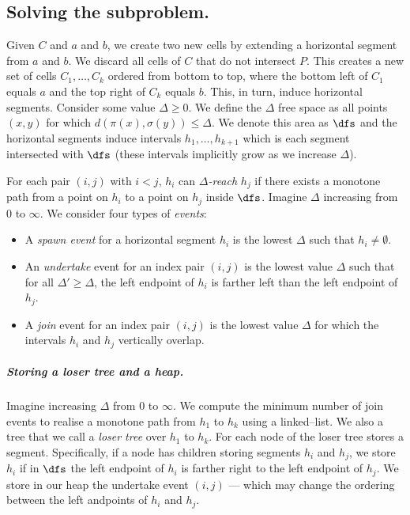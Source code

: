 \subsection{Solving the subproblem.}
Given $C$ and $a$ and $b$, we create two new cells by extending a horizontal segment from $a$ and $b$. We discard all cells of $C$ that do not intersect $P$. 
This creates a new set of cells $C_1, \ldots, C_k$ ordered from bottom to top, where the bottom left of $C_1$ equals $a$ and the top right of $C_k$ equals $b$. 
This, in turn,  induce horizontal segments. 
Consider some value $\Delta \geq 0$.
We define the $\Delta$ free space as all points $(x, y)$ for which $d(\pi(x), \sigma(y)) \leq \Delta$. We denote this area as $\dfs$ and the horizontal segments induce intervals  $h_1, \ldots, h_{k+1}$ which is each segment intersected with $\dfs$ (these intervals implicitly grow as we increase $\Delta$). 

For each pair $(i, j)$ with $i < j$, $h_i$ can \emph{$\Delta$-reach} $h_j$ if there exists a monotone path from a point on $h_i$ to a point on $h_j$ inside $\dfs$.
Imagine $\Delta$ increasing from $0$ to $\infty$.
We consider four types of \emph{events}:
\begin{itemize}
    \item A \emph{spawn event} for a horizontal segment $h_i$ is the lowest $\Delta$ such that $h_i \neq \emptyset$.
    \item An \emph{undertake} event for an index pair $(i, j)$ is the lowest value $\Delta$ such that for all $\Delta' \geq \Delta$, the left endpoint of $h_i$ is farther left than the left endpoint of $h_j$. 
    \item A \emph{join} event for an index pair $(i, j)$ is the lowest value $\Delta$ for which the intervals $h_i$ and $h_j$ vertically overlap. 
\end{itemize}



\subparagraph{Storing a loser tree and a heap.}
Imagine increasing $\Delta$ from $0$ to $\infty$. 
We compute the minimum number of join events to realise a monotone path from $h_1$ to $h_{k}$ using a linked–list.
We also a tree that we call a \emph{loser tree} over $h_1$ to $h_k$. 
For each node of the loser tree stores a segment.
Specifically, if a node has children storing segments $h_i$ and $h_j$, we store $h_i$ if in $\dfs$ the left endpoint of $h_i$ is farther right to the left endpoint of $h_j$. We store in our heap the undertake event $(i, j)$ --- which may change the ordering between the left andpoints of $h_i$ and $h_j$. 

